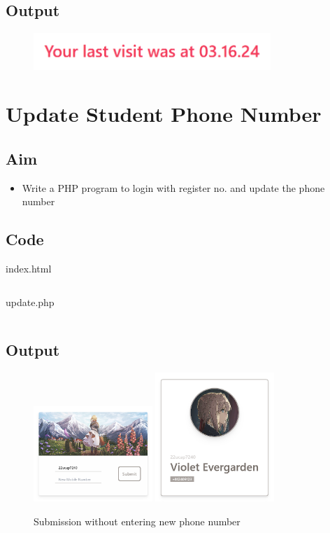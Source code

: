 \documentclass{article}
\begin{document}
\subsection{Output}
\begin{figure}[h!]
	\centering
	\includegraphics[width=0.8\textwidth]{./Assets/p25.png}
\end{figure}
\newpage
\section{Update Student Phone Number}
\subsection{Aim}
\begin{itemize}
  \item Write a PHP program to login with register no. and update the phone number
\end{itemize}

\subsection{Code}
index.html
\inputminted[frame=lines, breaklines, breakanywhere, numberblanklines=false]{html}{./prog_26/index.html}
update.php
\inputminted[frame=lines, breaklines, breakanywhere, numberblanklines=false]{php}{./prog_26/update.php}

\subsection{Output}
\begin{figure}[h!]
  \centering
  \caption{Submission without entering new phone number}
  \includegraphics[width=0.4\textwidth]{./Assets/p2601.png}
  \includegraphics[width=0.4\textwidth]{./Assets/p2602.png}
\end{figure}
\end{document}
